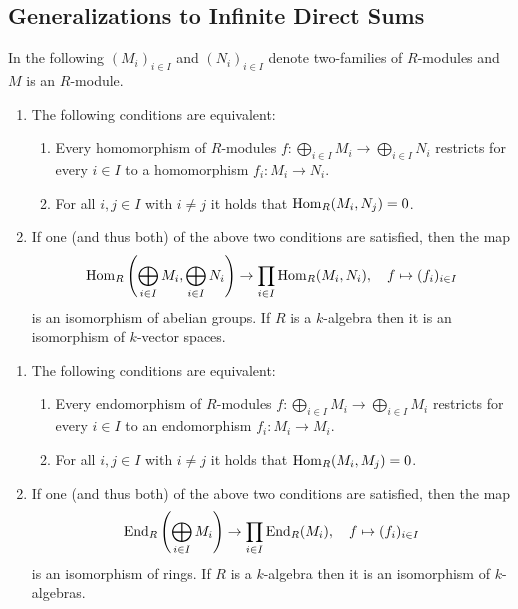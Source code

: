 \subsection{Generalizations to Infinite Direct Sums}


\begin{conventions}
  In the following $(M_i)_{i \in I}$ and $(N_i)_{i \in I}$ denote two-families of $R$-modules and $M$ is an $R$-module.
\end{conventions}


\begin{proposition}
  \leavevmode
  \begin{enumerate}
    \item
      The following conditions are equivalent:
      \begin{enumerate}
        \item
          Every homomorphism of $R$-modules $f \colon \bigoplus_{i \in I} M_i \to \bigoplus_{i \in I} N_i$ restricts for every $i \in I$ to a homomorphism $f_i \colon M_i \to N_i$.
        \item
          For all $i, j \in I$ with $i \neq j$ it holds that $\operatorname{Hom}_R(M_i, N_j) = 0$.
      \end{enumerate}
    \item
      If one (and thus both) of the above two conditions are satisfied, then the map
      \[
                \operatorname{Hom}_R\left( \bigoplus_{i \in I} M_i, \bigoplus_{i \in I} N_i \right)
        \to     \prod_{i \in I} \operatorname{Hom}_R(M_i, N_i),
        \quad   f
        \mapsto (f_i)_{i \in I}
      \]
      is an isomorphism of abelian groups.
      If $R$ is a $k$-algebra then it is an isomorphism of $k$-vector spaces.
  \end{enumerate}
\end{proposition}




\begin{corollary}
  \label{corollary: decomposition of endomorphism ring into product}
  \leavevmode
  \begin{enumerate}
    \item
      The following conditions are equivalent:
      \begin{enumerate}
        \item
          Every endomorphism of $R$-modules $f \colon \bigoplus_{i \in I} M_i \to \bigoplus_{i \in I} M_i$ restricts for every $i \in I$ to an endomorphism $f_i \colon M_i \to M_i$.
        \item
          For all $i, j \in I$ with $i \neq j$ it holds that $\operatorname{Hom}_R(M_i, M_j) = 0$.
      \end{enumerate}
    \item
      If one (and thus both) of the above two conditions are satisfied, then the map
      \[
                \operatorname{End}_R\left( \bigoplus_{i \in I} M_i \right)
        \to     \prod_{i \in I} \operatorname{End}_R(M_i),
        \quad   f
        \mapsto (f_i)_{i \in I}
      \]
      is an isomorphism of rings.
      If $R$ is a $k$-algebra then it is an isomorphism of $k$-algebras.
  \end{enumerate}
\end{corollary}


